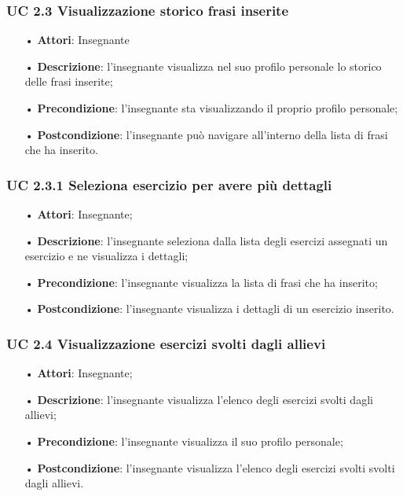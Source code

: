 \subsubsection{UC 2.3 Visualizzazione storico frasi inserite}


\begin{itemize}
	\item[•] \textbf{Attori}: Insegnante	   
	\item[•] \textbf{Descrizione}: l’insegnante visualizza nel suo profilo personale lo storico delle frasi inserite; 
	\item[•] \textbf{Precondizione}: l'insegnante sta visualizzando il proprio profilo personale;
	\item[•] \textbf{Postcondizione}: l’insegnante può navigare all’interno della lista di frasi che ha inserito.
\end{itemize}

\subsubsection{UC 2.3.1 Seleziona esercizio per avere più dettagli}
\begin{itemize}
	\item[•] \textbf{Attori}: Insegnante;
	\item[•] \textbf{Descrizione}: l’insegnante seleziona dalla lista degli esercizi assegnati un esercizio e ne visualizza i dettagli;
	\item[•] \textbf{Precondizione}: l'insegnante visualizza la lista di frasi che ha inserito;
	\item[•] \textbf{Postcondizione}: l’insegnante visualizza i dettagli di un esercizio inserito.
\end{itemize}



\subsubsection{UC 2.4 Visualizzazione esercizi svolti dagli allievi}
\begin{itemize}
	\item[•] \textbf{Attori}: Insegnante;
	\item[•] \textbf{Descrizione}:  l’insegnante visualizza l’elenco degli esercizi svolti dagli allievi;
	\item[•] \textbf{Precondizione}:  l’insegnante visualizza il suo profilo personale;

	\item[•] \textbf{Postcondizione}: l’insegnante visualizza l'elenco degli esercizi svolti svolti dagli allievi.
\end{itemize}

